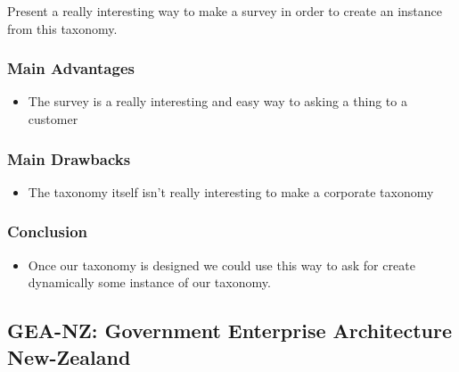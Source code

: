 \documentclass[12pt]{report}
\begin{document}
Present a really interesting way to make a survey in order to create an instance from this taxonomy.\par


\vspace{\baselineskip}
\subsubsection*{Main Advantages }
\begin{itemize}
	\item The survey is a really interesting and easy way to asking a thing to a customer\par

\vspace{\baselineskip}
\end{itemize}\subsubsection*{Main Drawbacks }
\begin{itemize}
	\item The taxonomy itself isn’t really interesting to make a corporate taxonomy\par

\vspace{\baselineskip}
\end{itemize}\subsubsection*{ Conclusion }
\begin{itemize}
	\item Once our taxonomy is designed we could use this way to ask for create dynamically some instance of our taxonomy.\par




\newpage

\vspace{\baselineskip}
\end{itemize}\subsection*{GEA-NZ: Government Enterprise Architecture New-Zealand }
\end{document}
